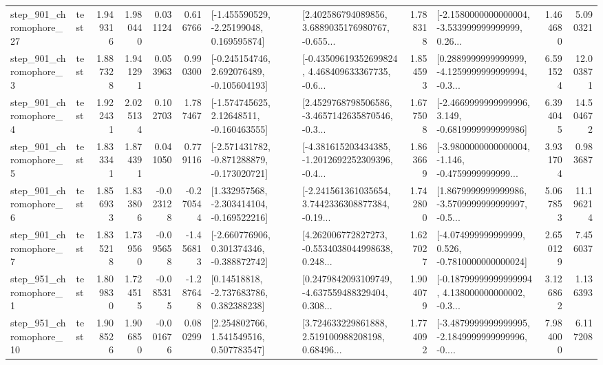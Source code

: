 \begin{tabular}{llrrrrllrlrr}
  step\_901\_chromophore\_27 &      test &      1.949316 &    1.980440 &      0.031124 &  0.616766 &    [-1.455590529, -2.25199048, 0.169595874] &  [2.402586794089856, 3.6889035176980767, -0.655... &       1.788318 &  [-2.1580000000000004, -3.533999999999999, 0.26... &            1.464680 &          5.090321 \\
   step\_901\_chromophore\_3 &      test &      1.887328 &    1.941291 &      0.053963 &  0.990300 &   [-0.245154746, 2.692076489, -0.105604193] &  [-0.43509619352699824, 4.468409633367735, -0.6... &       1.854593 &  [0.2889999999999999, -4.1259999999999994, -0.3... &            6.591524 &         12.003871 \\
   step\_901\_chromophore\_4 &      test &      1.922431 &    2.025134 &      0.102703 &  1.787467 &    [-1.574745625, 2.12648511, -0.160463555] &  [2.4529768798506586, -3.4657142635870546, -0.3... &       1.677508 &  [-2.4669999999999996, 3.149, -0.6819999999999986] &            6.394045 &         14.504672 \\
   step\_901\_chromophore\_5 &      test &      1.833341 &    1.874391 &      0.041050 &  0.779116 &  [-2.571431782, -0.871288879, -0.173020721] &  [-4.381615203434385, -1.2012692252309396, -0.4... &       1.863669 &  [-3.9800000000000004, -1.146, -0.4759999999999... &            3.931704 &          0.983687 \\
   step\_901\_chromophore\_6 &      test &      1.856933 &    1.833806 &     -0.023128 & -0.270544 &   [1.332957568, -2.303414104, -0.169522216] &  [-2.241561361035654, 3.7442336308877384, -0.19... &       1.742800 &  [1.8679999999999986, -3.5709999999999997, -0.5... &            5.067853 &         11.196214 \\
   step\_901\_chromophore\_7 &      test &      1.835218 &    1.739560 &     -0.095658 & -1.456813 &   [-2.660776906, 0.301374346, -0.388872742] &  [4.262006772827273, -0.5534038044998638, 0.248... &       1.627027 &   [-4.074999999999999, 0.526, -0.7810000000000024] &            2.650129 &          7.456037 \\
   step\_951\_chromophore\_1 &      test &      1.809830 &    1.724515 &     -0.085315 & -1.287648 &     [0.14518818, -2.737683786, 0.382388238] &  [0.2479842093109749, -4.637559488329404, 0.308... &       1.904079 &  [-0.18799999999999994, 4.138000000000002, -0.3... &            3.126862 &          1.136393 \\
  step\_951\_chromophore\_10 &      test &      1.908526 &    1.906850 &     -0.001676 &  0.080299 &     [2.254802766, 1.541549516, 0.507783547] &  [3.724633229861888, 2.519100988208198, 0.68496... &       1.774092 &  [-3.4879999999999995, -2.1849999999999996, -0.... &            7.984000 &          6.117208 \\

\end{tabular}

